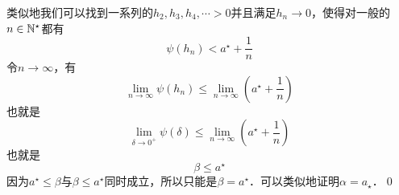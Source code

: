 类似地我们可以找到一系列的$h_2, h_3, h_4, \cdots > 0$并且满足$h_n \to 0$，使得对一般的$n \in \mathbb{N}^\star$都有
\begin{equation}
    \psi (h_n) < a^\star + \frac{1}{n}
\end{equation}
令$n \to \infty$，有
\begin{equation}
    \lim_{n \to \infty} \psi (h_n) \leq \lim_{n \to \infty} \left( a^\star + \frac{1}{n} \right)
\end{equation}
也就是
\begin{equation}
   \lim_{\delta \to 0^+} \psi (\delta)  \leq \lim_{n \to \infty} \left(a^\star + \frac{1}{n}\right)
\end{equation}
也就是
\begin{equation}
    \beta \leq a^\star
\end{equation}
因为$a^\star \leq \beta$与$\beta \leq a^\star$同时成立，所以只能是$\beta = a^\star$．可以类似地证明$\alpha = a_\star$．\qed\bigskip